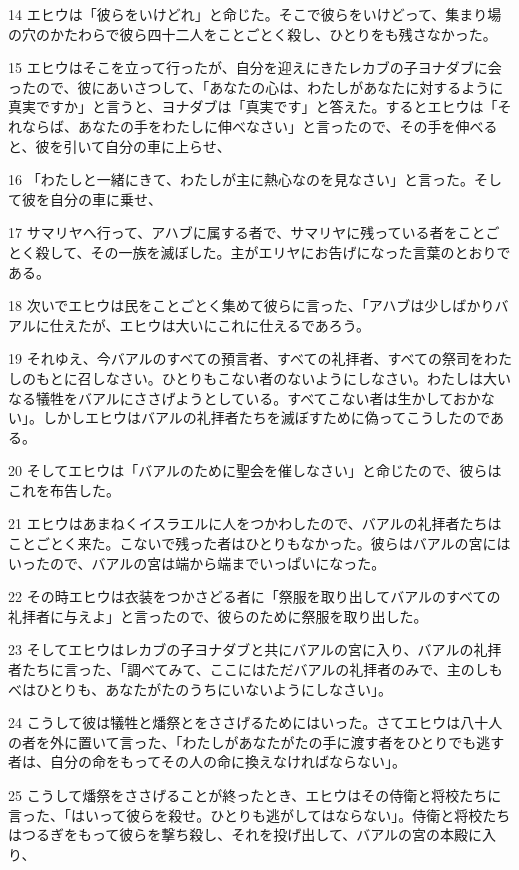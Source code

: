 \par 14 エヒウは「彼らをいけどれ」と命じた。そこで彼らをいけどって、集まり場の穴のかたわらで彼ら四十二人をことごとく殺し、ひとりをも残さなかった。
\par 15 エヒウはそこを立って行ったが、自分を迎えにきたレカブの子ヨナダブに会ったので、彼にあいさつして、「あなたの心は、わたしがあなたに対するように真実ですか」と言うと、ヨナダブは「真実です」と答えた。するとエヒウは「それならば、あなたの手をわたしに伸べなさい」と言ったので、その手を伸べると、彼を引いて自分の車に上らせ、
\par 16 「わたしと一緒にきて、わたしが主に熱心なのを見なさい」と言った。そして彼を自分の車に乗せ、
\par 17 サマリヤへ行って、アハブに属する者で、サマリヤに残っている者をことごとく殺して、その一族を滅ぼした。主がエリヤにお告げになった言葉のとおりである。
\par 18 次いでエヒウは民をことごとく集めて彼らに言った、「アハブは少しばかりバアルに仕えたが、エヒウは大いにこれに仕えるであろう。
\par 19 それゆえ、今バアルのすべての預言者、すべての礼拝者、すべての祭司をわたしのもとに召しなさい。ひとりもこない者のないようにしなさい。わたしは大いなる犠牲をバアルにささげようとしている。すべてこない者は生かしておかない」。しかしエヒウはバアルの礼拝者たちを滅ぼすために偽ってこうしたのである。
\par 20 そしてエヒウは「バアルのために聖会を催しなさい」と命じたので、彼らはこれを布告した。
\par 21 エヒウはあまねくイスラエルに人をつかわしたので、バアルの礼拝者たちはことごとく来た。こないで残った者はひとりもなかった。彼らはバアルの宮にはいったので、バアルの宮は端から端までいっぱいになった。
\par 22 その時エヒウは衣装をつかさどる者に「祭服を取り出してバアルのすべての礼拝者に与えよ」と言ったので、彼らのために祭服を取り出した。
\par 23 そしてエヒウはレカブの子ヨナダブと共にバアルの宮に入り、バアルの礼拝者たちに言った、「調べてみて、ここにはただバアルの礼拝者のみで、主のしもべはひとりも、あなたがたのうちにいないようにしなさい」。
\par 24 こうして彼は犠牲と燔祭とをささげるためにはいった。さてエヒウは八十人の者を外に置いて言った、「わたしがあなたがたの手に渡す者をひとりでも逃す者は、自分の命をもってその人の命に換えなければならない」。
\par 25 こうして燔祭をささげることが終ったとき、エヒウはその侍衛と将校たちに言った、「はいって彼らを殺せ。ひとりも逃がしてはならない」。侍衛と将校たちはつるぎをもって彼らを撃ち殺し、それを投げ出して、バアルの宮の本殿に入り、
